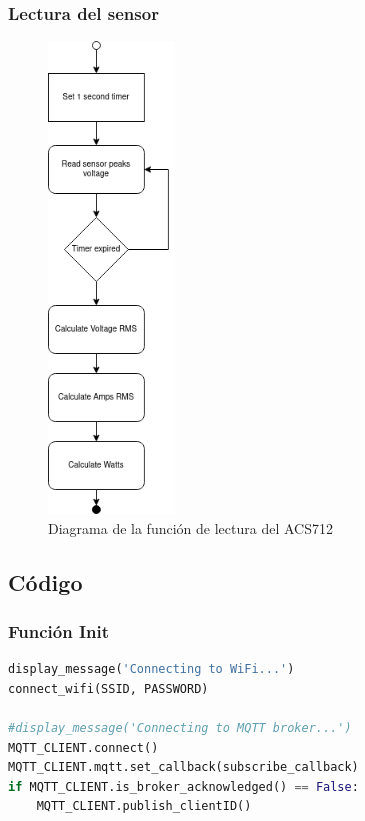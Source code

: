\begin{titlepage}
\subsubsection{Lectura del sensor}
\begin{figure}[h!]
	\centering
	\includegraphics[width=0.30\textwidth]{imagenes/acs712.drawio.png}
	\caption{Diagrama de la función de lectura del ACS712}
\end{figure}

\subsection{Código}
\subsubsection{Función Init}
\begin{lstlisting}[language=python]
display_message('Connecting to WiFi...')
connect_wifi(SSID, PASSWORD)

#display_message('Connecting to MQTT broker...')
MQTT_CLIENT.connect()
MQTT_CLIENT.mqtt.set_callback(subscribe_callback)
if MQTT_CLIENT.is_broker_acknowledged() == False:
	MQTT_CLIENT.publish_clientID()


\end{lstlisting}
\end{titlepage}
